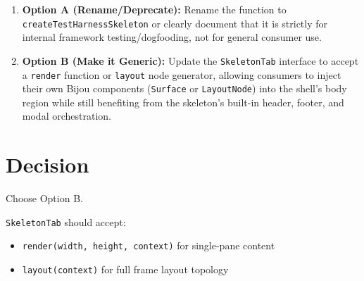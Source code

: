 \begin{enumerate}
\def\labelenumi{\arabic{enumi}.}
\tightlist
\item
  \textbf{Option A (Rename/Deprecate):} Rename the function to \texttt{c\allowbreak{}r\allowbreak{}e\allowbreak{}a\allowbreak{}t\allowbreak{}e\allowbreak{}T\allowbreak{}e\allowbreak{}s\allowbreak{}t\allowbreak{}H\allowbreak{}a\allowbreak{}r\allowbreak{}n\allowbreak{}e\allowbreak{}s\allowbreak{}s\allowbreak{}S\allowbreak{}k\allowbreak{}e\allowbreak{}l\allowbreak{}e\allowbreak{}t\allowbreak{}o\allowbreak{}n} or clearly document that it is strictly for internal framework testing/dogfooding, not for general consumer use.
\item
  \textbf{Option B (Make it Generic):} Update the \texttt{S\allowbreak{}k\allowbreak{}e\allowbreak{}l\allowbreak{}e\allowbreak{}t\allowbreak{}o\allowbreak{}n\allowbreak{}T\allowbreak{}a\allowbreak{}b} interface to accept a \texttt{r\allowbreak{}e\allowbreak{}n\allowbreak{}d\allowbreak{}e\allowbreak{}r} function or \texttt{l\allowbreak{}a\allowbreak{}y\allowbreak{}o\allowbreak{}u\allowbreak{}t} node generator, allowing consumers to inject their own Bijou components (\texttt{S\allowbreak{}u\allowbreak{}r\allowbreak{}f\allowbreak{}a\allowbreak{}c\allowbreak{}e} or \texttt{L\allowbreak{}a\allowbreak{}y\allowbreak{}o\allowbreak{}u\allowbreak{}t\allowbreak{}N\allowbreak{}o\allowbreak{}d\allowbreak{}e}) into the shell's body region while still benefiting from the skeleton's built-in header, footer, and modal orchestration.
\end{enumerate}

\section{Decision}\label{record-130-decision}

Choose Option B.

\texttt{S\allowbreak{}k\allowbreak{}e\allowbreak{}l\allowbreak{}e\allowbreak{}t\allowbreak{}o\allowbreak{}n\allowbreak{}T\allowbreak{}a\allowbreak{}b} should accept:

\begin{itemize}
\tightlist
\item
  \texttt{r\allowbreak{}e\allowbreak{}n\allowbreak{}d\allowbreak{}e\allowbreak{}r\allowbreak{}(\allowbreak{}w\allowbreak{}i\allowbreak{}d\allowbreak{}t\allowbreak{}h\allowbreak{},\allowbreak{} \allowbreak{}h\allowbreak{}e\allowbreak{}i\allowbreak{}g\allowbreak{}h\allowbreak{}t\allowbreak{},\allowbreak{} \allowbreak{}c\allowbreak{}o\allowbreak{}n\allowbreak{}t\allowbreak{}e\allowbreak{}x\allowbreak{}t\allowbreak{})} for single-pane content
\item
  \texttt{l\allowbreak{}a\allowbreak{}y\allowbreak{}o\allowbreak{}u\allowbreak{}t\allowbreak{}(\allowbreak{}c\allowbreak{}o\allowbreak{}n\allowbreak{}t\allowbreak{}e\allowbreak{}x\allowbreak{}t\allowbreak{})} for full frame layout topology
\end{itemize}

